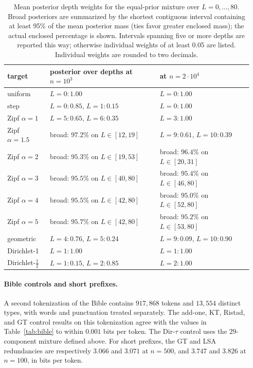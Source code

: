 \documentclass[anon]{alt2027}
\begin{document}
\begin{table}[t]
\centering
\footnotesize
\caption{Mean posterior depth weights for the equal-prior mixture over $L=0,\ldots,80$. Broad posteriors are summarized by the shortest contiguous interval containing at least 95\% of the mean posterior mass (ties favor greater enclosed mass); the actual enclosed percentage is shown. Intervals spanning five or more depths are reported this way; otherwise individual weights of at least 0.05 are listed. Individual weights are rounded to two decimals.}
\label{tab:posteriors}
\setlength{\tabcolsep}{2pt}
\begin{tabular}{lll}
\toprule
target & posterior over depths at $n=10^3$ & at $n=2\cdot10^4$ \\
\midrule
uniform & $L{=}0:1.00$ & $L{=}0:1.00$ \\
step & $L{=}0:0.85$, $L{=}1:0.15$ & $L{=}0:1.00$ \\
Zipf $\alpha=1$ & $L{=}5:0.65$, $L{=}6:0.35$ & $L{=}3:1.00$ \\
Zipf $\alpha=1.5$ & broad: $97.2\%$ on $L\in[12,19]$ & $L{=}9:0.61$, $L{=}10:0.39$ \\
Zipf $\alpha=2$ & broad: $95.3\%$ on $L\in[19,53]$ & broad: $96.4\%$ on $L\in[20,31]$ \\
Zipf $\alpha=3$ & broad: $95.5\%$ on $L\in[40,80]$ & broad: $95.4\%$ on $L\in[46,80]$ \\
Zipf $\alpha=4$ & broad: $95.5\%$ on $L\in[42,80]$ & broad: $95.0\%$ on $L\in[52,80]$ \\
Zipf $\alpha=5$ & broad: $95.7\%$ on $L\in[42,80]$ & broad: $95.2\%$ on $L\in[53,80]$ \\
geometric & $L{=}4:0.76$, $L{=}5:0.24$ & $L{=}9:0.09$, $L{=}10:0.90$ \\
Dirichlet-1 & $L{=}1:1.00$ & $L{=}1:1.00$ \\
Dirichlet-$\frac12$ & $L{=}1:0.15$, $L{=}2:0.85$ & $L{=}2:1.00$ \\
\bottomrule
\end{tabular}
\end{table}

\paragraph{Bible controls and short prefixes.} A second tokenization of the Bible contains $917{,}868$ tokens and $13{,}554$ distinct types, with words and punctuation treated separately. The add-one, KT, Ristad, and GT control results on this tokenization agree with the values in Table~\ref{tab:bible} to within $0.001$ bits per token. The Dir-$\tau$ control uses the $29$-component mixture defined above. For short prefixes, the GT and LSA redundancies are respectively $3.066$ and $3.071$ at $n=500$, and $3.747$ and $3.826$ at $n=100$, in bits per token.
\end{document}
